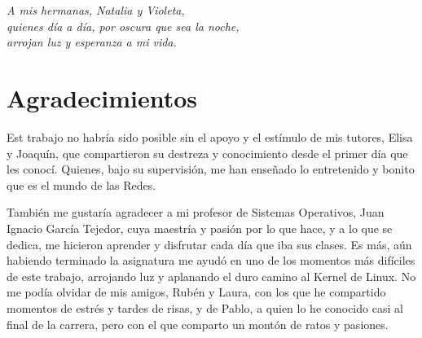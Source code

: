 

\cleardoublepage %
\chapter*{}
\setlength{\leftmargin}{0.5\textwidth}
\setlength{\parsep}{0cm}
\addtolength{\topsep}{0.5cm}
\begin{flushright}
	\small\em{
		A mis hermanas, Natalia y Violeta,\\
		quienes día a día, por oscura que sea la noche,\\
		arrojan luz y esperanza a mi vida.
	}
\end{flushright}




\chapter*{Agradecimientos}

\thispagestyle{empty}
\vspace{1cm}

Est trabajo no habría sido posible sin el apoyo y el estímulo de mis tutores, Elisa y Joaquín, que compartieron su destreza y conocimiento desde el primer día que les conocí. Quienes, bajo su supervisión, me han enseñado lo entretenido y bonito que es el mundo de las Redes. \newline

También me gustaría agradecer a mi profesor de Sistemas Operativos, Juan Ignacio García Tejedor, cuya maestría y pasión por lo que hace, y a lo que se dedica, me hicieron aprender y disfrutar cada día que iba sus clases. Es más, aún habiendo terminado la asignatura me ayudó en uno de los momentos más difíciles de este trabajo, arrojando luz y aplanando el duro camino al Kernel de Linux. No me podía olvidar de mis amigos, Rubén y Laura, con los que he compartido momentos de estrés y tardes de risas, y de Pablo, a quien lo he conocido casi al final de la carrera, pero con el que comparto un montón de ratos y pasiones. \newline


